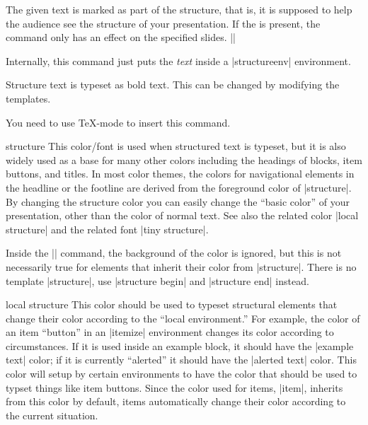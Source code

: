 \begin{command}{\structure{}}
  The given text is marked as part of the structure, that is, it is
  supposed to help the audience see the structure of your
  presentation. If the  is present, the
  command only has an effect on the specified slides.
  \example||

  Internally, this command just puts the \emph{text} inside a
  |structureenv| environment.

  \articlenote
  Structure text is typeset as bold text. This can be changed by
  modifying the templates.

  \lyxnote
  You need to use \TeX-mode to insert this command.

  \begin{element}{structure}\no\yes\yes
    This color/font is used when structured text is typeset, but it is
    also widely used as a base for many other colors including the
    headings of blocks, item buttons, and titles. In most color
    themes, the colors for navigational elements in the headline or
    the footline are derived from the foreground color of
    |structure|. By changing the structure color you can easily change
    the ``basic color'' of your presentation, other than the color of
    normal text. See also the related color |local structure| and the
    related font |tiny structure|.

    Inside the |\structure| command, the background of the color is
    ignored, but this is not necessarily true for elements that
    inherit their color from |structure|. There is no template
    |structure|, use |structure begin| and |structure end| instead.
  \end{element}

  \begin{element}{local structure}\no\yes\no
    This color should be used to typeset structural elements that change
    their color according to the ``local environment.'' For example, the
    color of an item ``button'' in an |itemize| environment changes its
    color according to circumstances. If it is used inside an example
    block, it should have the |example text| color; if it is currently
    ``alerted'' it should have the |alerted text| color. This color
    will setup by certain environments to have the color that should be
    used to typset things like item buttons. Since the color used for
    items, |item|, inherits from this color by default, items
    automatically change their color according to the current
    situation.


\end{element}
\end{command}
